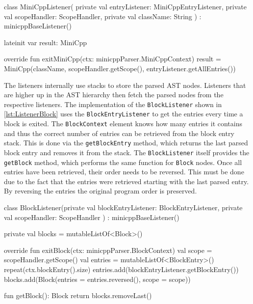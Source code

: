 \begin{KotlinCode}[float,numbers=none,caption=Implementation of the \texttt{MiniCppListener} class., label=lst:ListenerMiniCpp]
class MiniCppListener(
    private val entryListener: MiniCppEntryListener,
    private val scopeHandler: ScopeHandler,
    private val className: String
) : minicppBaseListener() {

    lateinit var result: MiniCpp

    override fun exitMiniCpp(ctx: minicppParser.MiniCppContext) {
        result = MiniCpp(className, 
                         scopeHandler.getScope(), 
                         entryListener.getAllEntries())
    }
    
}
\end{KotlinCode}

The listeners internally use stacks to store the parsed AST nodes. Listeners that are higher up in the AST hierarchy then fetch the parsed nodes from the respective listeners. The implementation of the \verb|BlockListener| shown in \ref{lst:ListenerBlock} uses the \verb|BlockEntryListener| to get the entries every time a block is exited. The \verb|BlockContext| element knows how many entries it contains and thus the correct number of entries can be retrieved from the block entry stack. This is done via the \verb|getBlockEntry| method, which returns the last parsed block entry and removes it from the stack. The \verb|BlockListener| itself provides the \verb|getBlock| method, which performs the same function for \verb|Block| nodes. Once all entries have been retrieved, their order needs to be reversed. This must be done due to the fact that the entries were retrieved starting with the last parsed entry. By reversing the entries the original program order is preserved. 


\begin{KotlinCode}[float,numbers=none,caption=Implementation of the \texttt{BlockListener} class., label=lst:ListenerBlock]
class BlockListener(private val blockEntryListener: BlockEntryListener,
    private val scopeHandler: ScopeHandler
) : minicppBaseListener() {

    private val blocks = mutableListOf<Block>()
    
    override fun exitBlock(ctx: minicppParser.BlockContext) {
        val scope = scopeHandler.getScope()
        val entries = mutableListOf<BlockEntry>()
        repeat(ctx.blockEntry().size) {
            entries.add(blockEntryListener.getBlockEntry())
        }
        blocks.add(Block(entries = entries.reversed(), scope = scope))
    }
    
    fun getBlock(): Block {
        return blocks.removeLast()
}
}
    \end{KotlinCode}


